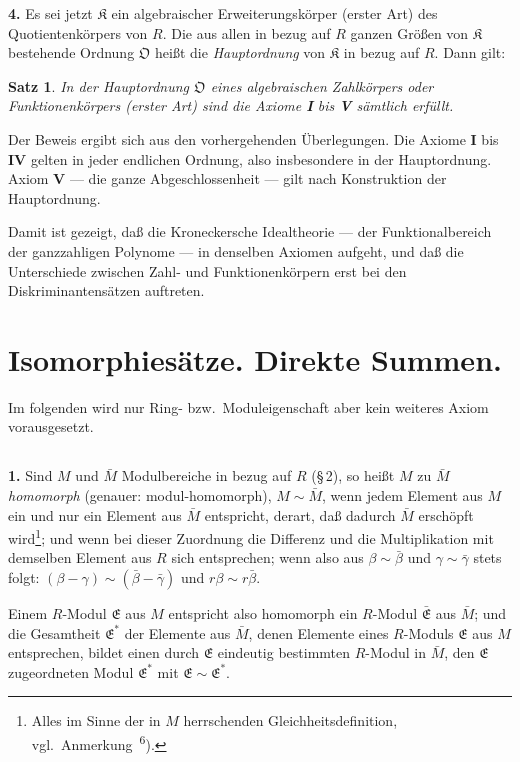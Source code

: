 \documentclass[12pt,a4paper]{article}
\newcommand{\fE}{\mathfrak{E}}
\newcommand{\fK}{\mathfrak{K}}
\newcommand{\fO}{\mathfrak{O}}
\theoremstyle{plain}
\newtheorem{Satz}{Satz}[section]
\theoremstyle{definition}
\theoremstyle{remark}
\begin{document}
\medskip
\noindent
\textbf{4.} Es sei jetzt $\fK$ ein algebraischer Erweiterungskörper (erster Art) des Quotientenkörpers von $R$. Die aus allen in bezug auf $R$ ganzen Größen von $\fK$ bestehende Ordnung $\fO$ heißt die \textit{Hauptordnung} von $\fK$ in bezug auf $R$. Dann gilt:

\begin{Satz}
In der Hauptordnung $\fO$ eines algebraischen Zahlkörpers oder Funktionenkörpers (erster Art) sind die Axiome \textbf{I} bis \textbf{V} sämtlich erfüllt.
\end{Satz}

Der Beweis ergibt sich aus den vorhergehenden Überlegungen. Die Axiome \textbf{I} bis \textbf{IV} gelten in jeder endlichen Ordnung, also insbesondere in der Hauptordnung. Axiom \textbf{V} --- die ganze Abgeschlossenheit --- gilt nach Konstruktion der Hauptordnung.

Damit ist gezeigt, daß die Kroneckersche Idealtheorie --- der Funktionalbereich der ganzzahligen Polynome --- in denselben Axiomen aufgeht, und daß die Unterschiede zwischen Zahl- und Funktionenkörpern erst bei den Diskriminantensätzen auftreten.

\newpage
\section{Isomorphiesätze. Direkte Summen.}

\noindent
Im folgenden wird nur Ring- bzw.\ Moduleigenschaft aber kein weiteres Axiom vorausgesetzt.

\setcounter{Satz}{0}
\subsection{}

\noindent
\textbf{1.} Sind $M$ und $\bar{M}$ Modulbereiche in bezug auf $R$ (\S\,2), so heißt $M$ zu $\bar{M}$ \textit{homomorph} (genauer: modul-homomorph), $M \sim \bar{M}$, wenn jedem Element aus $M$ ein und nur ein Element aus $\bar{M}$ entspricht, derart, daß dadurch $\bar{M}$ erschöpft wird\footnote{Alles im Sinne der in $M$ herrschenden Gleichheitsdefinition, vgl.\ Anmerkung\ \textsuperscript{6}).}; und wenn bei dieser Zuordnung die Differenz und die Multiplikation mit demselben Element aus $R$ sich entsprechen; wenn also aus $\beta \sim \bar{\beta}$ und $\gamma \sim \bar{\gamma}$ stets folgt: $(\beta - \gamma) \sim (\bar{\beta} - \bar{\gamma})$ und $r\beta \sim r\bar{\beta}$.

Einem $R$-Modul $\fE$ aus $M$ entspricht also homomorph ein $R$-Modul $\bar{\fE}$ aus $\bar{M}$; und die Gesamtheit $\fE^{*}$ der Elemente aus $\bar{M}$, denen Elemente eines $R$-Moduls $\fE$ aus $M$ entsprechen, bildet einen durch $\fE$ eindeutig bestimmten $R$-Modul in $\bar{M}$, den $\fE$ zugeordneten Modul $\fE^{*}$ mit $\fE \sim \fE^{*}$.
\end{document}
